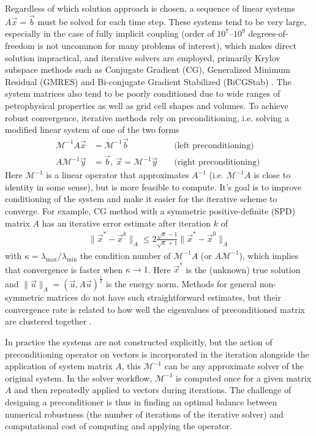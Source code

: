 Regardless of which solution approach is chosen, a sequence of linear systems $A \vec{x} = \vec{b}$ must be solved for each time step.   These systems tend to be very large, especially in the case of fully implicit coupling (order of $10^7$--$10^9$ degrees-of-freedom is not uncommon for many problems of interest), which makes direct solution impractical, and iterative solvers are employed, primarily Krylov subspace methods such as Conjugate Gradient (CG), Generalized Minimum Residual (GMRES) and Bi-conjugate Gradient Stabilized (BiCGStab) \cite{Saad2003}.   The system matrices also tend to be poorly conditioned due to wide ranges of petrophysical properties as well as grid cell shapes and volumes.   To achieve robust convergence, iterative methods rely on preconditioning, i.e. solving a modified linear system of one of the two forms
\begin{align}
    \mathcal{M}^{-1}A \vec{x} &= \mathcal{M}^{-1}\vec{b} & & \mbox{ (left preconditioning) } \label{eq:prec_left} \\
    A \mathcal{M}^{-1} \vec{y} &= \vec{b}, \: \vec{x} = \mathcal{M}^{-1} \vec{y} & & \mbox{ (right preconditioning) } \label{eq:prec_right}
\end{align}
Here $\mathcal{M}^{-1}$ is a linear operator that approximates $A^{-1}$ (i.e. $\mathcal{M}^{-1}A$ is close to identity in some sense), but is more feasible to compute.   It's goal is to improve conditioning of the system and make it easier for the iterative scheme to converge.   For example, CG method with a symmetric positive-definite (SPD) matrix $A$ has an iterative error estimate after iteration $k$ of
\begin{align}
    \|\vec{x}^* - \vec{x}^k\|_A \leq 2\frac{\sqrt{\kappa} - 1}{\sqrt{\kappa} + 1} \|\vec{x}^* - \vec{x}^0\|_A
\end{align}
with $\kappa = \lambda_{\max}/\lambda_{\min}$ the condition number of $\mathcal{M}^{-1}A$ (or $A\mathcal{M}^{-1}$), which implies that convergence is faster when $\kappa \to 1$.   Here $\vec{x}^*$ is the (unknown) true solution and $\|\vec{u}\|_A = (\vec{u},A\vec{u})^{\frac{1}{2}}$ is the energy norm.   Methods for general non-symmetric matrices do not have such straightforward estimates, but their convergence rate is related to how well the eigenvalues of preconditioned matrix are clustered together \cite{Saad2003}.

In practice the systems  are not constructed explicitly, but the action of preconditioning operator on vectors is incorporated in the iteration alongside the application of system matrix $A$, this $\mathcal{M}^{-1}$ can be any approximate solver of the original system.   In the solver workflow, $\mathcal{M}^{-1}$ is computed once for a given matrix $A$ and then repeatedly applied to vectors during iterations.   The challenge of designing a preconditioner is thus in finding an optimal balance between numerical robustness (the number of iterations of the iterative solver) and computational cost of computing and applying the operator.

